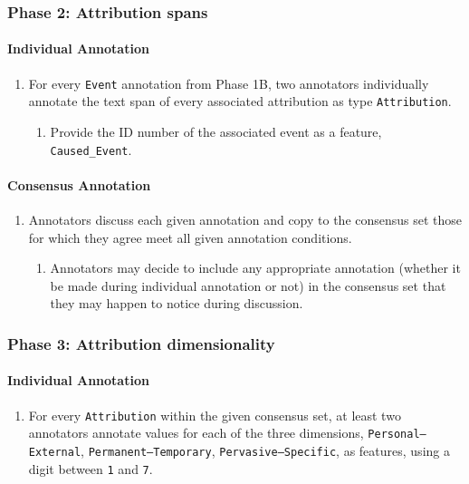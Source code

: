 \documentclass[a4paper,12pt]{article}
\begin{document}
    \subsubsection{Phase 2: Attribution spans}
    \paragraph{Individual Annotation}
        \begin{enumerate}
            \item For every \texttt{Event} annotation from Phase 1B, two annotators individually annotate the text span of every associated attribution as type \texttt{Attribution}.
                \begin{enumerate}
                    \item Provide the ID number of the associated event as a feature, \texttt{Caused\_Event}.
                \end{enumerate}
        \end{enumerate}
    \paragraph{Consensus Annotation}
        \begin{enumerate}
            \item Annotators discuss each given annotation and copy to the consensus set those for which they agree meet all given annotation conditions.
                \begin{enumerate}
                    \item Annotators may decide to include any appropriate annotation (whether it be made during individual annotation or not) in the consensus set that they may happen to notice during discussion.
                \end{enumerate}
        \end{enumerate}

    \subsubsection{Phase 3: Attribution dimensionality}
    \paragraph{Individual Annotation}
    
        \begin{enumerate}
            \item For every \texttt{Attribution} within the given consensus set, at least two annotators annotate values for each of the three dimensions, \texttt{Personal--External}, \texttt{Permanent--Temporary}, \texttt{Pervasive--Specific}, as features, using a digit between \texttt{1} and \texttt{7}.
        \end{enumerate}
\end{document}
